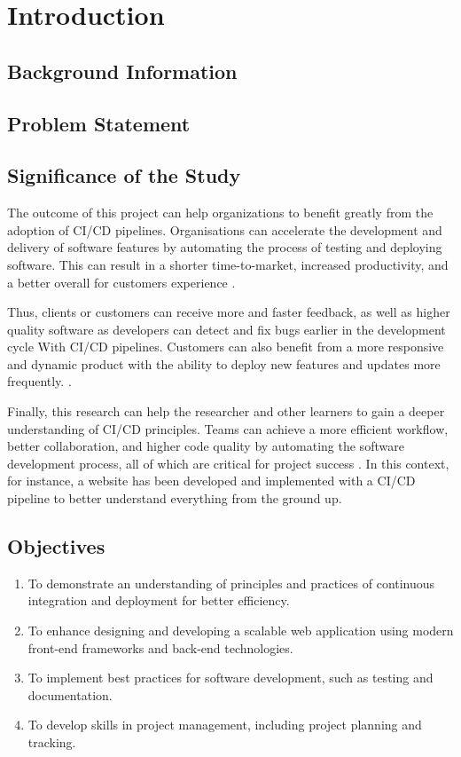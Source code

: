 \chapter{Introduction}

\section{Background Information}

\section{Problem Statement}

\section{Significance of the Study}
The outcome of this project can help organizations to benefit greatly from the adoption of CI/CD pipelines. Organisations can accelerate the development and delivery of software features by automating the process of testing and deploying software. This can result in a shorter time-to-market, increased productivity, and a better overall for customers experience \cite{hf}.

Thus, clients or customers can receive more and faster feedback, as well as higher quality software as developers can detect and fix bugs earlier in the development cycle With CI/CD pipelines. Customers can also benefit from a more responsive and dynamic product with the ability to deploy new features and updates more frequently. \cite{chen, leppanenetal}.

Finally, this research can help the researcher and other learners to gain a deeper understanding of CI/CD principles. Teams can achieve a more efficient workflow, better collaboration, and higher code quality by automating the software development process, all of which are critical for project success \cite{sander}. In this context, for instance, a website has been developed and implemented with a CI/CD pipeline to better understand everything from the ground up.

\section{Objectives}
\begin{enumerate}
  \item To demonstrate an understanding of principles and practices of continuous integration and deployment for better efficiency.
  \item To enhance designing and developing a scalable web application using modern front-end frameworks and back-end technologies.
  \item To implement best practices for software development, such as testing and documentation.
  \item To develop skills in project management, including project planning and tracking.
\end{enumerate}

